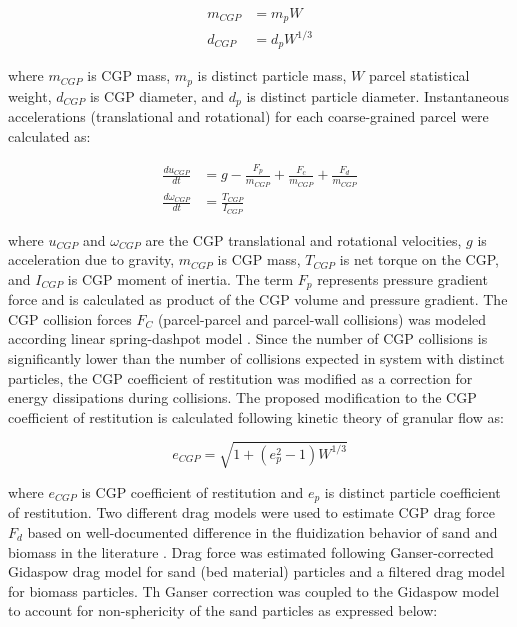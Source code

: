 \begin{align}
    m_{CGP} &= m_p W \\
    d_{CGP} &= d_p W^{1/3}
\end{align}

where $m_{CGP}$ is CGP mass, $m_p$ is distinct particle mass, $W$ parcel statistical weight, $d_{CGP}$ is CGP diameter, and $d_p$ is distinct particle diameter. Instantaneous accelerations (translational and rotational) for each coarse-grained parcel were calculated as:

\begin{align}
    \frac{d u_{CGP}}{dt} &= g - \frac{F_p}{m_{CGP}} + \frac{F_c}{m_{CGP}} + \frac{F_d}{m_{CGP}} \\
    \frac{d \omega_{CGP}}{dt} &= \frac{T_{CGP}}{I_{CGP}}
\end{align}

where $u_{CGP}$ and $\omega_{CGP}$ are the CGP translational and rotational velocities, $g$ is acceleration due to gravity, $m_{CGP}$ is CGP mass, $T_{CGP}$ is net torque on the CGP, and $I_{CGP}$ is CGP moment of inertia. The term $F_p$ represents pressure gradient force and is calculated as product of the CGP volume and pressure gradient. The CGP collision forces $F_C$ (parcel-parcel and parcel-wall collisions) was modeled according linear spring-dashpot model \cite{Navarro-2013}. Since the number of CGP collisions is significantly lower than the number of collisions expected in system with distinct particles, the CGP coefficient of restitution was modified as a correction for energy dissipations during collisions. The proposed modification to the CGP coefficient of restitution is calculated following kinetic theory of granular flow \cite{Lu-2014} as:

\begin{equation}
    e_{CGP} = \sqrt{1 + (e_p^2 - 1) W^{1/3}}
\end{equation}

where $e_{CGP}$ is CGP coefficient of restitution and $e_p$ is distinct particle coefficient of restitution. Two different drag models were used to estimate CGP drag force $F_d$ based on well-documented difference in the fluidization behavior of sand and biomass in the literature \cite{Oliveira-2013}. Drag force was estimated following Ganser-corrected Gidaspow drag model for sand (bed material) particles and a filtered drag model for biomass particles. Th Ganser correction \cite{Ganser-1993} was coupled to the Gidaspow model \cite{Gidaspow-1994} to account for non-sphericity of the sand particles as expressed below:

